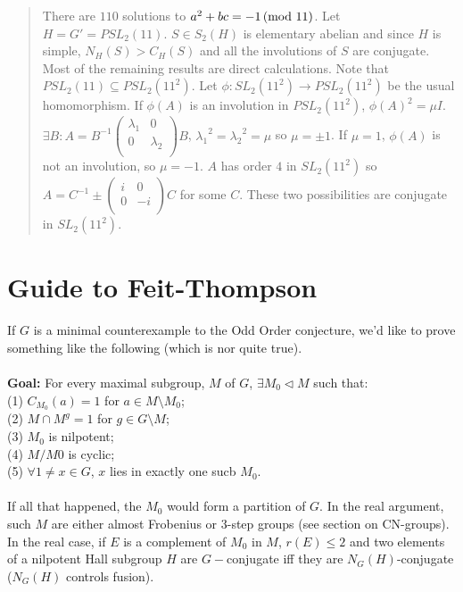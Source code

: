 \begin{quote}
There are $110$ solutions to $a^2 + bc = -1 \thinspace \textnormal{(mod } 11 \textnormal{)}$.
Let $H=G'=PSL_2(11)$.  $S \in S_2(H)$ is elementary abelian and since $H$ is simple,
$N_H(S) > C_H(S)$ and all the involutions of $S$ are conjugate. Most of the remaining
results are direct calculations.  Note that $PSL_2(11) \subseteq PSL_2(11^2)$. Let
$\phi: SL_2(11^2) \rightarrow PSL_2(11^2)$ be the usual homomorphism.  If $\phi(A)$ is an
involution in $PSL_2(11^2)$, $\phi(A)^2 = \mu I$.  $\exists B: A = B^{-1}
\left(
\begin{array}{cc}
\lambda_1 &  0 \\
0 &  \lambda_2 \\
\end{array}
\right)
B$, $ {\lambda_1}^2 = {\lambda_2}^2 = \mu$ so $\mu = \pm 1$.  If $\mu =1$, $\phi(A)$ is not an involution,
so $\mu = -1$.  $A$ has order $4$ in $SL_2(11^2)$ so $A = C^{-1}
\pm \left(
\begin{array}{cc}
i &  0 \\
0 &  -i \\
\end{array}
\right)
C$ for some $C$.  These two possibilities are conjugate in $SL_2(11^2)$.
\end{quote}
\section {Guide to Feit-Thompson} 
If $G$ is a minimal counterexample to the Odd Order conjecture, we'd like to prove something like
the following (which is nor quite true).
\\
\\
{\bf Goal:} For every maximal subgroup, $M$ of $G$, $\exists M_0 \lhd M$ such that:
\\ (1) $C_{M_0}(a) =1$ for $a \in M \setminus M_0$;
\\ (2) $M \cap M^g =1$ for $g \in G \setminus M$;
\\ (3) $M_0$ is nilpotent;
\\ (4) $M/M0$ is cyclic;
\\ (5) $\forall 1 \ne x \in G$, $x$ lies in exactly one sucb $M_0$.
\\
\\
If all that happened, the $M_0$ would form a partition of $G$.
In the real argument, such $M$ are either almost Frobenius or $3$-step groups (see section on CN-groups).
In the real case, if $E$ is a complement of $M_0$ in $M$, $r(E) \leq 2$ and two elements of a nilpotent Hall
subgroup $H$ are $G-$conjugate iff they are $N_G(H)$-conjugate ($N_G(H)$ controls fusion).



